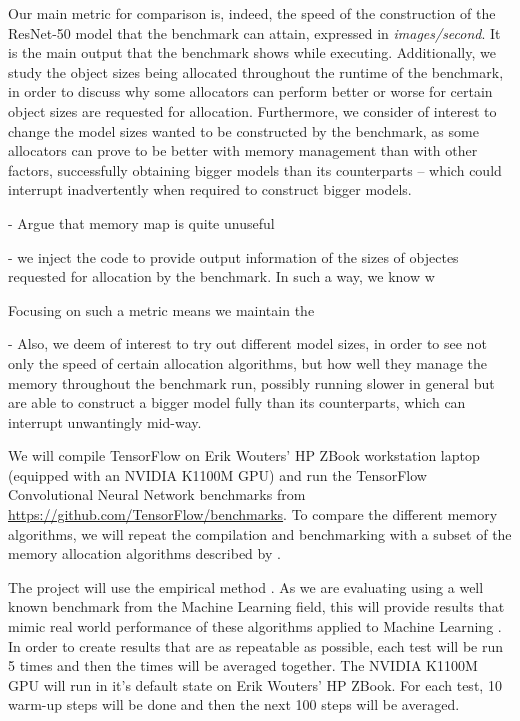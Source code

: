 \documentclass[12pt,twoside]{article}
\begin{document}
Our main metric for comparison is, indeed, the speed of the construction of the ResNet-50 model that the benchmark can attain, expressed in \textit{images/second}. It is the main output that the benchmark shows while executing. Additionally, we study the object sizes being allocated throughout the runtime of the benchmark, in order to discuss why some allocators can perform better or worse for certain object sizes are requested for allocation. Furthermore, we consider of interest to change the model sizes wanted to be constructed by the benchmark, as some allocators can prove to be better with memory management than with other factors, successfully obtaining bigger models than its counterparts -- which could interrupt inadvertently when required to construct bigger models.

- Argue that memory map is quite unuseful

-  we inject the code to provide output information of the sizes of objectes requested for allocation by the benchmark. In such a way, we know w

Focusing on such a metric means we maintain the 

- Also, we deem of interest to try out different model sizes, in order to see not only the speed of certain allocation algorithms, but how well they manage the memory throughout the benchmark run, possibly running slower in general but are able to construct a bigger model fully than its counterparts, which can interrupt unwantingly mid-way.


We will compile TensorFlow on Erik Wouters' HP ZBook workstation laptop (equipped with an NVIDIA K1100M GPU) and run the TensorFlow Convolutional Neural Network benchmarks from \url{https://github.com/TensorFlow/benchmarks}. To compare the different memory algorithms, we will repeat the compilation and benchmarking with a subset of the memory allocation algorithms described by \citeauthor{Vinkler2015} \cite{Vinkler2015}.

The project will use the empirical method \cite{bock2001}. As we are evaluating using a well known benchmark from the Machine Learning field, this will provide results that mimic real world performance of these algorithms applied to Machine Learning \cite{abadi2016}. In order to create results that are as repeatable as possible, each test will be run 5 times and then the times will be averaged together. The NVIDIA K1100M GPU will run in it's default state on Erik Wouters' HP ZBook. For each test, 10 warm-up steps will be done and then the next 100 steps will be averaged. 
\end{document}

